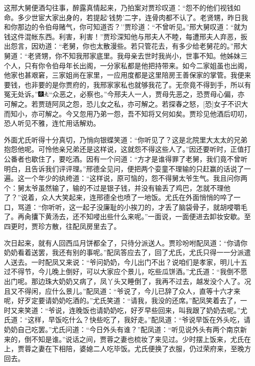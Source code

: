 这邢大舅便酒勾往事，醉露真情起来，乃拍案对贾珍叹道：``怨不的他们视钱如命。多少世宦大家出身的，若提起`钱势'二字，连骨肉都不认了。老贤甥，昨日我和你那边的令伯母赌气，你可知道否？''贾珍道：``不曾听见。''邢大舅叹道：``就为钱这件混帐东西。利害，利害！''贾珍深知他与邢夫人不睦，每遭邢夫人弃恶，扳出怨言，因劝道：``老舅，你也太散漫些。若只管花去，有多少给老舅花的。''邢大舅道：``老贤甥，你不知我邢家底里。我母亲去世时我尚小，世事不知。他姊妹三个人，只有你令伯母年长出阁，一分家私都是他把持带来。如今二家姐虽也出阁，他家也甚艰窘，三家姐尚在家里，一应用度都是这里陪房王善保家的掌管。我便来要钱，也非要的是你贾府的，我邢家家私也就够我花了。无奈竟不得到手，所以有冤无处诉。''{\includegraphics[width=3mm]{../Images/00004}\includegraphics[width=3mm]{../Images/00012}\footnotesize \kaishu ``众恶之，必察也。''今邢夫人一人，贾母先恶之，恐贾母心偏，亦可解之。若贾琏阿凤之怨，恐儿女之私，亦可解之。若探春之怒，{[}恐{]}女子不识大而知小，亦可解之。今又忽用乃弟一怨，吾不知将又何如矣。}贾珍见他酒后叨叨，恐人听见不雅，连忙用话解劝。

外面尤氏听得十分真切，乃悄向银蝶笑道：``你听见了？这是北院里大太太的兄弟抱怨他呢。可怜他亲兄弟还是这样说，这就怨不得这些人了。''因还要听时，正值打公番者也歇住了，要吃酒。因有一个问道：``方才是谁得罪了老舅，我们竟不曾听明白，且告诉我们评评理。''邢德全见问，便把两个娈童不理输的只赶赢的话说了一遍。这一个年少的纨绔道：``这样说，原可恼的，怨不得舅太爷生气。我且问你两个：舅太爷虽然输了，输的不过是银子钱，并没有输丢了鸡巴，怎就不理他了？''说着，众人大笑起来，连邢德全也喷了一地饭。尤氏在外面悄悄的啐了一口，骂道：``你听听，这一起子没廉耻的小挨刀的，才丢了脑袋骨子，就胡唚嚼毛了。再肏攮下黄汤去，还不知唚出些什么来呢。''一面说，一面便进去卸妆安歇。至四更时，贾珍方散，往配凤房里去了。

次日起来，就有人回西瓜月饼都全了，只待分派送人。贾珍吩咐配凤道：``你请你奶奶看着送罢，我还有别的事呢。''配凤答应去了，回了尤氏，尤氏只得一一分派遣人送去。一时配凤又来说：``爷问奶奶，今儿出门不出？说咱们是孝家，明儿十五过不得节，今儿晚上倒好，可以大家应个景儿，吃些瓜饼酒。''尤氏道：``我倒不愿出门呢。那边珠大奶奶又病了，凤丫头又睡倒了，我再不过去，越发没个人了。况且又不得闲，应什么景儿。''配凤道：``爷说了，今儿已辞了众人，直等十六才来呢，好歹定要请奶奶吃酒的。''尤氏笑道：``请我，我没的还席。''配凤笑着去了，一时又来笑道：``爷说，连晚饭也请奶奶吃，好歹早些回来，叫我跟了奶奶去呢。''尤氏道：``这样，早饭吃什么？快些吃了，我好走。''配凤道：``爷说早饭在外头吃，请奶奶自己吃罢。''尤氏问道：``今日外头有谁？''配凤道：``听见说外头有两个南京新来的，倒不知是谁。''说话之间，贾蓉之妻也梳妆了来见过。少时摆上饭来，尤氏在上，贾蓉之妻在下相陪，婆媳二人吃毕饭。尤氏便换了衣服，仍过荣府来，至晚方回去。


